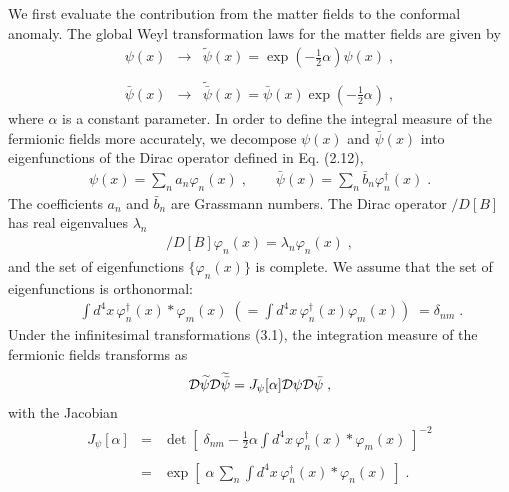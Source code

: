 \documentclass[a4paper,12pt]{article}
\begin{document}
We first evaluate the contribution from the matter fields to the conformal 
anomaly. The global Weyl transformation laws for the matter fields are 
given by 
%
%
\begin{eqnarray}
\psi(x) & \longrightarrow & \widetilde{\psi}(x) 
= \exp\left( -\frac{1}{2}\alpha \right) \psi(x) \;, \nonumber \\ 
 & &  \\
\bar{\psi}(x) & \longrightarrow & \widetilde{\bar{\psi}}(x) 
= \bar{\psi}(x) \exp\left( -\frac{1}{2}\alpha \right) \;, \nonumber 
\end{eqnarray}
%
where $\alpha$ is a constant parameter. In order to define the integral 
measure of the fermionic fields more accurately, we decompose $\psi(x)$ 
and $\bar{\psi}(x)$ into eigenfunctions of the Dirac operator defined in 
Eq. (2.12),
%
%
\begin{eqnarray}
\psi(x) = \sum_{n}a_{n}\varphi_{n}(x) \;, \qquad 
\bar{\psi}(x) = \sum_{n}\bar{b}_{n}\varphi_{n}^{\dagger}(x) \;.
\end{eqnarray}
%
The coefficients $a_{n}$ and $\bar{b}_{n}$ are Grassmann numbers. 
The Dirac operator $/\!\!\!\!D[B]$ has real eigenvalues $\lambda_{n}$
%
%
\begin{eqnarray}
/\!\!\!\!D[B] \varphi_{n}(x) = \lambda_{n}\varphi_{n}(x) \;,
\end{eqnarray}
%
and the set of eigenfunctions $\{\varphi_{n}(x)\}$ is complete. 
We assume that the set of eigenfunctions is orthonormal: 
%
%
\begin{eqnarray}
& & \int d^{4}x \, \varphi_{n}^{\dagger}(x) \ast \varphi_{m}(x) 
\; (= \int d^{4}x \, \varphi_{n}^{\dagger}(x) \varphi_{m}(x))\; 
= \delta_{nm} \;. 
\end{eqnarray}
%
Under the infinitesimal transformations (3.1), 
the integration measure of the fermionic fields transforms as
%
%
\begin{eqnarray}
{\cal D}\widetilde{\psi} {\cal D}\widetilde{\bar{\psi}} = 
J_{\psi}[\alpha]{\cal D}\psi {\cal D}\bar{\psi} \;,
\end{eqnarray}
%
with the Jacobian 
%
%
\begin{eqnarray}
J_{\psi}[\alpha] \!\!&=&\!\! \det \left[\; \delta_{nm} 
 - \frac{1}{2} \alpha \int d^{4}x \, \varphi_{n}^{\dagger}(x) \ast 
\varphi_{m}(x) \; \right]^{-2} \nonumber \\
 & & \\
\!\!&=&\!\! \exp \left[\; \alpha\, \sum_{n}  
\int d^{4}x \, \varphi_{n}^{\dagger}(x) \ast 
\varphi_{n}(x)  \; \right] \nonumber \;.
\end{eqnarray}
\end{document}
